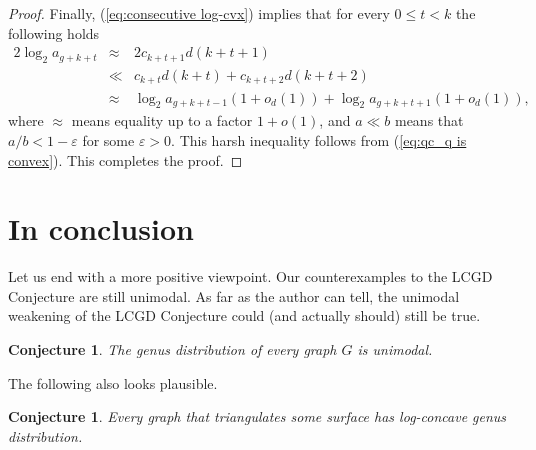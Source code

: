\documentclass[11pt]{article}
\newtheorem{conjecture}[theorem]{Conjecture}
\begin{document}
\begin{proof}
  Finally, (\ref{eq:consecutive log-cvx}) implies that for every $0\le t <k$ the following holds
  \begin{eqnarray*}
    2\log_2 a_{g+k+t} &\approx& 2c_{k+t+1}d(k+t+1) \\
     &\ll& c_{k+t}d(k+t) + c_{k+t+2}d(k+t+2) \\
     &\approx& \log_2 a_{g+k+t-1}(1+o_d(1)) + \log_2 a_{g+k+t+1}(1+o_d(1)),
  \end{eqnarray*}
  where $\approx$ means equality up to a factor $1+o(1)$, and $a\ll b$ means that $a/b < 1-\varepsilon$ for some $\varepsilon>0$. This harsh inequality follows from (\ref{eq:qc_q is convex}). This completes the proof.
\end{proof}




\section{In conclusion}

Let us end with a more positive viewpoint.
Our counterexamples to the LCGD Conjecture are still unimodal. As far as the author can tell, the unimodal weakening of the LCGD Conjecture could (and actually should) still be true.

\begin{conjecture}
  The genus distribution of every graph $G$ is unimodal.
\end{conjecture}


The following also looks plausible.

\begin{conjecture}
  Every graph that triangulates some surface has log-concave genus distribution.
\end{conjecture}







\end{document}
